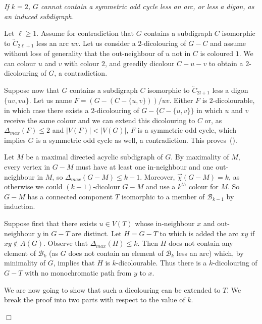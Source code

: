 \documentclass[11pt]{article}
\newcommand{\dic}{\vec{\chi}}
\newcounter{claim}
\newenvironment{proof}[1][]%
 {\noindent {\setcounter{claim}{0}\sc proof ---
   }{#1}{}}{\hfill$\Box$\vspace{2ex}}
\newenvironment{claim}[1][]%
{\refstepcounter{claim}\vspace{1ex}\noindent{(\it\arabic{claim}){#1}{}}\it}{\vspace{1ex}}
\newenvironment{proofclaim}[1][]%
	{\noindent {}{#1}{}}{ This proves~(\arabic{claim}).\vspace{2ex}}
\begin{document}
\begin{proof}
\begin{claim}
If $k = 2$, $G$ cannot contain a symmetric odd cycle less an arc, or less a digon, as an induced subdigraph. 
\end{claim}

\begin{proofclaim}

Let $\ell \geq 1$.
Assume for contradiction that $G$ contains a subdigraph $C$ isomorphic to $\overleftrightarrow{C}_{2\ell + 1}$ less an arc $uv$. Let us consider a $2$-dicolouring of $G - C$ and assume without loss of generality that the out-neighbour of $u$ not in $C$ is coloured $1$. We can colour $u$ and $v$ with colour $2$, and greedily dicolour $C - u - v$ to obtain a $2$-dicolouring of $G$, a contradiction.

Suppose now that $G$ contains a subdigraph $C$ isomorphic to $\overleftrightarrow{C}_{2l + 1}$ less a digon $\{uv,vu\}$. 
Let us name $F = (G - (C - \{u,v\})) / uv$. Either $F$ is $2$-dicolourable, in which case there exists a $2$-dicolouring of $G - \{C-\{u,v\}\}$ in which $u$ and $v$ receive the same colour and we can extend this dicolouring to $C$ or, as $\Delta_{max}(F) \leq 2$ and $|V(F)| < |V(G)|$, $F$ is a symmetric odd cycle, which implies $G$ is a symmetric odd cycle as well, a contradiction.
\end{proofclaim}

Let $M$ be a maximal directed acyclic subdigraph of $G$. By maximality of $M$, every vertex in $G-M$ must have at least one in-neighbour and one out-neighbour in $M$, so $\Delta_{max}(G - M) \leq k-1$. 
Moreover, $\dic(G - M) = k$,  as otherwise we could $(k - 1)$-dicolour $G - M$ and use a $k^{th}$ colour for $M$. So $G-M$ has a connected component $T$ isomorphic to a member of $\mathcal B_{k-1}$ by induction. 

Suppose first that there exists $u \in V(T)$ whose in-neighbour $x$ and out-neighbour $y$ in $G - T$ are distinct. 
Let $H = G - T$ to which is added the arc $xy$ if   $xy \notin A(G)$. 
Observe that $\Delta_{max}(H) \leq k$. 
Then $H$ does not contain any element of $\mathcal B_{k}$ (as $G$ does not contain an element of $\mathcal B_{k}$ less an arc) which, by minimality of $G$, implies that $H$ is $k$-dicolourable. Thus there is a $k$-dicolouring of $G - T$ with no monochromatic path from $y$ to $x$.

We are now going to show that such a dicolouring can be extended to $T$. We break the proof into two parts with respect to the value of $k$. 


\end{proof}
\end{document}
